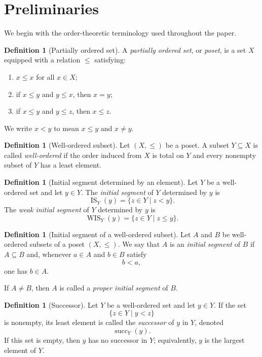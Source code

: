 \documentclass[11pt]{article}
\theoremstyle{definition}
\newtheorem{definition}[theorem]{Definition}
\theoremstyle{remark}
\newcommand{\IS}{\operatorname{IS}}
\newcommand{\WIS}{\operatorname{WIS}}
\newcommand{\succop}{\operatorname{succ}}
\begin{document}
\section{Preliminaries}

We begin with the order-theoretic terminology used throughout the paper.

\begin{definition}[Partially ordered set]
A \emph{partially ordered set}, or \emph{poset}, is a set \(X\) equipped with a relation
\(\leq\) satisfying:
\begin{enumerate}
\item \(x\leq x\) for all \(x\in X\);
\item if \(x\leq y\) and \(y\leq x\), then \(x=y\);
\item if \(x\leq y\) and \(y\leq z\), then \(x\leq z\).
\end{enumerate}
We write \(x<y\) to mean \(x\leq y\) and \(x\neq y\).
\end{definition}

\begin{definition}[Well-ordered subset]
Let \((X,\leq)\) be a poset. A subset \(Y\subseteq X\) is called \emph{well-ordered}
if the order induced from \(X\) is total on \(Y\) and every nonempty subset of \(Y\) has a
least element.
\end{definition}

\begin{definition}[Initial segment determined by an element]
Let \(Y\) be a well-ordered set and let \(y\in Y\). The \emph{initial segment} of \(Y\)
determined by \(y\) is
\[
\IS_Y(y)=\{z\in Y\mid z<y\}.
\]
The \emph{weak initial segment} of \(Y\) determined by \(y\) is
\[
\WIS_Y(y)=\{z\in Y\mid z\leq y\}.
\]
\end{definition}

\begin{definition}[Initial segment of a well-ordered subset]
Let \(A\) and \(B\) be well-ordered subsets of a poset \((X,\leq)\). We say that
\(A\) is an \emph{initial segment} of \(B\) if \(A\subseteq B\) and, whenever
\(a\in A\) and \(b\in B\) satisfy
\[
b<a,
\]
one has \(b\in A\).

If \(A\neq B\), then \(A\) is called a \emph{proper initial segment} of \(B\).
\end{definition}

\begin{definition}[Successor]
Let \(Y\) be a well-ordered set and let \(y\in Y\). If the set
\[
\{z\in Y\mid y<z\}
\]
is nonempty, its least element is called the \emph{successor} of \(y\) in \(Y\), denoted
\[
\succop_Y(y).
\]
If this set is empty, then \(y\) has no successor in \(Y\); equivalently, \(y\) is the largest
element of \(Y\).
\end{definition}
\end{document}
